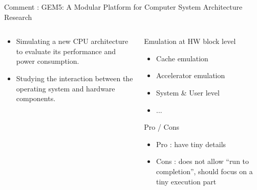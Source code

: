 \begin{Frame}{Comment : GEM5: A Modular Platform for Computer System Architecture Research}
 \begin{columns}[t]
  \begin{column}{\BW}
    \begin{block}{\hfill{} }
      \begin{itemize}
      \item Simulating a new CPU architecture to evaluate its
        performance and power consumption.
      \item Studying the interaction between the operating system and
        hardware components.
      \end{itemize}
    \end{block}
  \end{column}  \begin{column}{\BW}
    \begin{block}{Emulation at HW block level }
      \begin{itemize}
      \item Cache emulation
      \item Accelerator emulation
      \item System \& User level
      \item ...
      \end{itemize}
    \end{block}
    \begin{alertblock}{Pro / Cons}
      \begin{itemize}
      \item Pro : have tiny details
      \item Cons : does not allow ``run to completion'', should focus
        on a tiny execution part
      \end{itemize}
    \end{alertblock}
  \end{column}
 \end{columns}
\end{Frame}
